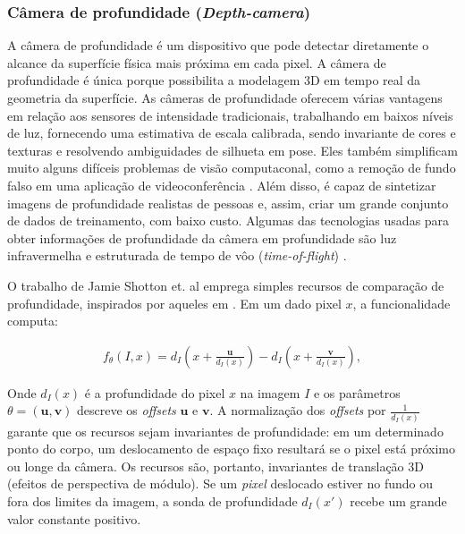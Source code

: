  \subsubsection{Câmera de profundidade (\textit{Depth-camera})}\label{sec:depth}
A câmera de profundidade é um dispositivo que pode detectar diretamente o alcance da superfície física mais próxima em cada pixel. A câmera de profundidade é única porque possibilita a modelagem 3D em tempo real da geometria da superfície. As câmeras de profundidade oferecem várias vantagens em relação aos sensores de intensidade tradicionais, trabalhando em baixos níveis de luz, fornecendo uma estimativa de escala calibrada, sendo invariante de cores e texturas e resolvendo ambiguidades de silhueta em pose. Eles também simplificam muito alguns difíceis problemas de visão computaconal, como a remoção de fundo falso em uma aplicação de videoconferência \cite{wilson2010combining}. Além disso, é capaz de sintetizar imagens de profundidade realistas de pessoas e, assim, criar um grande conjunto de dados de treinamento, com baixo custo. Algumas das tecnologias usadas para obter informações de profundidade da câmera em profundidade são luz infravermelha e estruturada de tempo de vôo (\textit{time-of-flight}) \cite{bogomjakov2006free}.

O trabalho de Jamie Shotton et. al\cite{Shotton:2013:RHP:2398356.2398381} emprega simples recursos de comparação de profundidade, inspirados por aqueles em \cite{lepetit2005randomized}. Em um dado pixel $x$, a funcionalidade computa: 

\begin{align}
{f_{\theta}}(I, x) = d_{I}  \left(x + \frac{\boldsymbol{u}}{d_{I}(x)}\right) -  d_{I} \left(x + \frac{\boldsymbol{v}}{d_{I}(x)}\right) ,
\label{eq:eq1}
\end{align}

Onde $d_{I}(x)$ é a profundidade do pixel $x$ na imagem $I$ e os parâmetros $\theta = (\boldsymbol{u,v})$ descreve os \textit{offsets} $\boldsymbol{u}$ e $\boldsymbol{v}$. A normalização dos \textit{offsets} por $\frac{1}{d_{I}(x)}$ garante que os recursos sejam invariantes de profundidade: em um determinado ponto do corpo, um deslocamento de espaço fixo resultará se o pixel está próximo ou longe da câmera. Os recursos são, portanto, invariantes de translação 3D (efeitos de perspectiva de módulo). Se um \textit{pixel} deslocado estiver no fundo ou fora dos limites da imagem, a sonda de profundidade $d_{I}(x')$ recebe um grande valor constante positivo.




